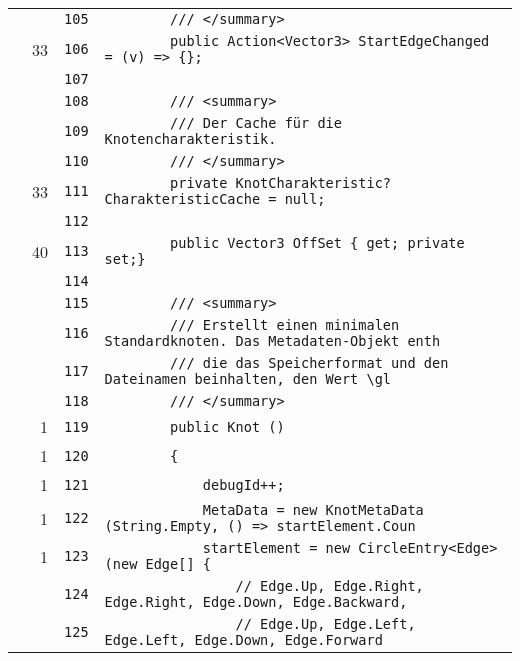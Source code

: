 \documentclass[a4paper,10pt]{article}
\begin{document}
\begin{longtable}[l]{lrrl}
\cellcolor{gray} &  & \verb~105~ & \verb~        /// </summary>~\\
\cellcolor{green} & 33 & \verb~106~ & \verb~        public Action<Vector3> StartEdgeChanged = (v) => {};~\\
\cellcolor{gray} &  & \verb~107~ & \verb~~\\
\cellcolor{gray} &  & \verb~108~ & \verb~        /// <summary>~\\
\cellcolor{gray} &  & \verb~109~ & \verb~        /// Der Cache für die Knotencharakteristik.~\\
\cellcolor{gray} &  & \verb~110~ & \verb~        /// </summary>~\\
\cellcolor{green} & 33 & \verb~111~ & \verb~        private KnotCharakteristic? CharakteristicCache = null;~\\
\cellcolor{gray} &  & \verb~112~ & \verb~~\\
\cellcolor{green} & 40 & \verb~113~ & \verb~        public Vector3 OffSet { get; private set;}~\\
\cellcolor{gray} &  & \verb~114~ & \verb~~\\
\cellcolor{gray} &  & \verb~115~ & \verb~        /// <summary>~\\
\cellcolor{gray} &  & \verb~116~ & \verb~        /// Erstellt einen minimalen Standardknoten. Das Metadaten-Objekt enth~\\
\cellcolor{gray} &  & \verb~117~ & \verb~        /// die das Speicherformat und den Dateinamen beinhalten, den Wert \gl~\\
\cellcolor{gray} &  & \verb~118~ & \verb~        /// </summary>~\\
\cellcolor{green} & 1 & \verb~119~ & \verb~        public Knot ()~\\
\cellcolor{green} & 1 & \verb~120~ & \verb~        {~\\
\cellcolor{green} & 1 & \verb~121~ & \verb~            debugId++;~\\
\cellcolor{green} & 1 & \verb~122~ & \verb~            MetaData = new KnotMetaData (String.Empty, () => startElement.Coun~\\
\cellcolor{green} & 1 & \verb~123~ & \verb~            startElement = new CircleEntry<Edge> (new Edge[] {~\\
\cellcolor{gray} &  & \verb~124~ & \verb~                // Edge.Up, Edge.Right, Edge.Right, Edge.Down, Edge.Backward,~\\
\cellcolor{gray} &  & \verb~125~ & \verb~                // Edge.Up, Edge.Left, Edge.Left, Edge.Down, Edge.Forward~\\

\end{longtable}
\end{document}
